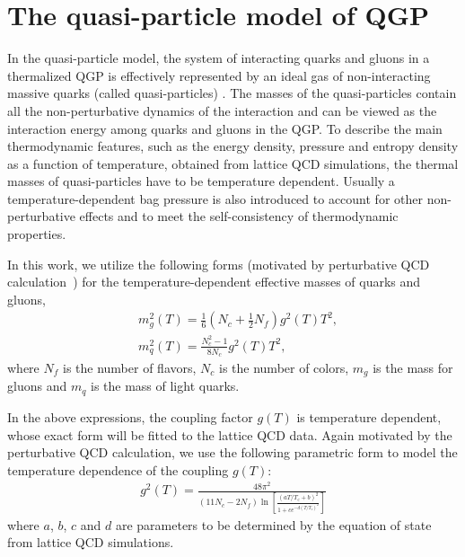 \documentclass[aps,superscriptaddress,prc,twocolumn,nofootinbib]{revtex4}
\begin{document}
\section{The quasi-particle model of QGP}
\label{sec:QPM}

In the quasi-particle model, the system of interacting quarks and gluons in a thermalized QGP is effectively represented by an ideal gas of non-interacting massive quarks (called quasi-particles) \cite{Gorenstein:1995vm,Levai:1997yx,Bozek:1998dj,Bluhm:2004xn,Plumari:2011mk, Cassing:2008nn, Cassing:2008sv, Gossiaux:2009mk, Cassing:2009vt, Bratkovskaya:2011wp, Berrehrah:2014kba, Das:2015ana, Berrehrah:2015ywa, Song:2015ykw, Scardina:2017ipo}.
The masses of the quasi-particles contain all the non-perturbative dynamics of the interaction and can be viewed as the interaction energy among quarks and gluons in the QGP.
To describe the main thermodynamic features, such as the energy density, pressure and entropy density as a function of temperature, obtained from lattice QCD simulations, the thermal masses of quasi-particles have to be temperature dependent.
Usually a temperature-dependent bag pressure is also introduced to account for other non-perturbative effects and to meet the self-consistency of thermodynamic properties.

In this work, we utilize the following forms (motivated by perturbative QCD calculation~\cite{Levai:1997yx}) for the temperature-dependent effective masses of quarks and gluons,
\begin{align}
  \label{eq:boltzmann1}
  & m_g^2(T) =\frac{1}{6} \left(N_c+\frac{1}{2} N_f \right)  g^2(T) T^2, \\
  & m_{q}^2(T) =\frac{N_c^2-1}{8N_c}g^2(T) T^2,
\end{align}
where $N_f$ is the number of flavors, $N_c$ is the number of colors, $m_g$ is the mass for gluons and $m_{q}$ is the mass of light quarks.

In the above expressions, the coupling factor $g(T)$ is temperature dependent, whose exact form will be fitted to the lattice QCD data. Again motivated by the perturbative QCD calculation, we use the following parametric form to model the temperature dependence of the coupling $g(T)$:
\begin{align}
g^2(T)=\frac{48 \pi^2}{(11 N_c-2 N_f) \ln \left[\frac{\left(a T/T_\mathrm{c}+b\right)^2 }{1+c e^{-d (T/T_\mathrm{c})^2 }}\right]}
\end{align}
where $a$, $b$, $c$ and $d$ are parameters to be determined by the equation of state from lattice QCD simulations.
\end{document}
